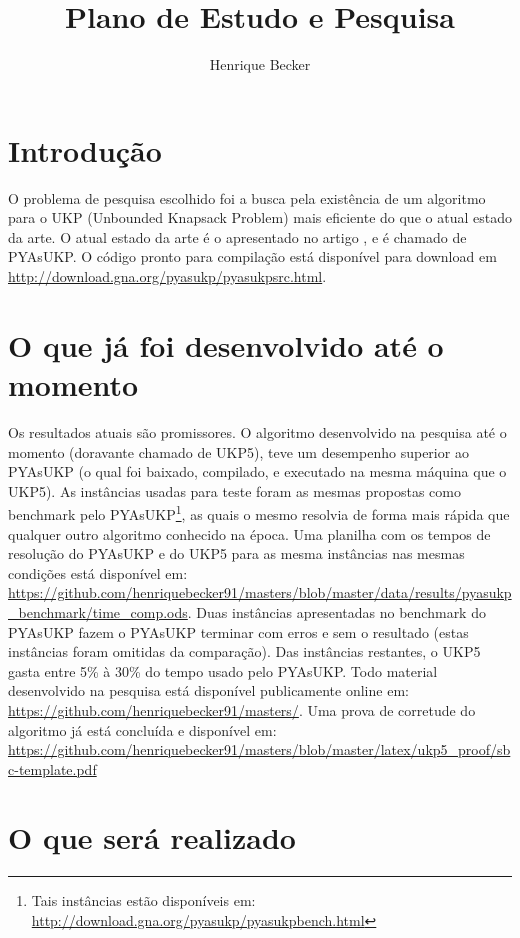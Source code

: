\documentclass[12pt]{article}
\title{Plano de Estudo e Pesquisa}
\author{Henrique Becker\inst{1}}
\begin{document}
 

\maketitle

\section{Introdução}

O problema de pesquisa escolhido foi a busca pela existência de um algoritmo para o UKP (Unbounded Knapsack Problem) mais eficiente do que o atual estado da arte. O atual estado da arte é o apresentado no artigo \cite{pyasukp}, e é chamado de PYAsUKP. O código pronto para compilação está disponível para download em \url{http://download.gna.org/pyasukp/pyasukpsrc.html}.

\section{O que já foi desenvolvido até o momento}

Os resultados atuais são promissores. O algoritmo desenvolvido na pesquisa até o momento (doravante chamado de UKP5), teve um desempenho superior ao PYAsUKP (o qual foi baixado, compilado, e executado na mesma máquina que o UKP5). As instâncias usadas para teste foram as mesmas propostas como benchmark pelo PYAsUKP\footnote{Tais instâncias estão disponíveis em: \url{http://download.gna.org/pyasukp/pyasukpbench.html}}, as quais o mesmo resolvia de forma mais rápida que qualquer outro algoritmo conhecido na época. Uma planilha com os tempos de resolução do PYAsUKP e do UKP5 para as mesma instâncias nas mesmas condições está disponível em: \url{https://github.com/henriquebecker91/masters/blob/master/data/results/pyasukp_benchmark/time_comp.ods}. Duas instâncias apresentadas no benchmark do PYAsUKP fazem o PYAsUKP terminar com erros e sem o resultado (estas instâncias foram omitidas da comparação). Das instâncias restantes, o UKP5 gasta entre 5\% à 30\% do tempo usado pelo PYAsUKP. Todo material desenvolvido na pesquisa está disponível publicamente online em: \url{https://github.com/henriquebecker91/masters/}. Uma prova de corretude do algoritmo já está concluída e disponível em: \url{https://github.com/henriquebecker91/masters/blob/master/latex/ukp5_proof/sbc-template.pdf}

\section{O que será realizado}
\end{document}
